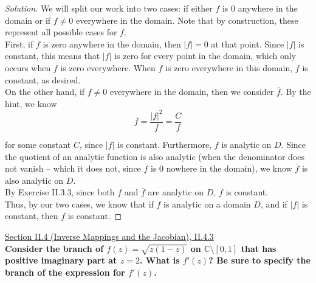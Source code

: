 \documentclass[11pt]{article}
\newcommand{\C}{\mathbb{C}}
\newenvironment{solution}
  {\renewcommand\qedsymbol{$\blacksquare$}\begin{proof}[Solution]}
  {\end{proof}}
\theoremstyle{definition}
\begin{document}
\begin{solution}
We will split our work into two cases: if either $f$ is $0$ anywhere in the domain or if $f \neq 0$ everywhere in the domain. Note that by construction, these represent all possible cases for $f$.\\

First, if $f$ is zero anywhere in the domain, 
then $|f| = 0$ at that point. Since $|f|$ is constant, this means that $|f|$ is zero for every point in the domain, which only occurs when $f$ is zero everywhere. When $f$ is zero everywhere in this domain, $f$ is constant, as desired. \\

On the other hand, if $f \neq 0$ everywhere in the domain, then we consider $\overline{f}$. By the hint, we know 
\[ \overline{f} = \frac{|f|^2}{f} = \frac{C}{f} \]

for some constant $C$, since $|f|$ is constant. Furthermore, $f$ is analytic on $D$. 
Since the quotient of an analytic function is also analytic (when the denominator does not vanish -- which it does not, since $f$ is $0$ nowhere in the domain), we know $\overline{f}$ is also analytic on $D$. \\

By Exercise II.3.3, since both $f$ and $\overline{f}$ are analytic on $D$, $f$ is constant. \\

Thus, by our two cases, we know that if $f$ is analytic on a domain $D$, and if $|f|$ is constant, then $f$ is constant. \end{solution}

\newpage

\underline{Section II.4 (Inverse Mappings and the Jacobian), II.4.3} \\

\textbf{Consider the branch of $f(z) = \sqrt{z(1-z)}$ on $\C \setminus [0, 1]$ that has positive imaginary part at $z=2$. 
What is $f'(z)$? Be sure to specify the branch of the expression for $f'(z)$.} \\
\end{document}
